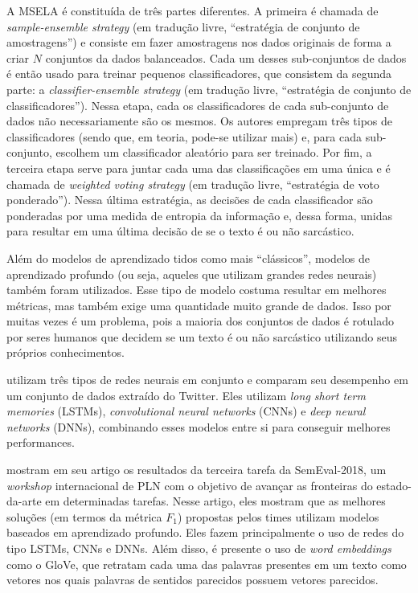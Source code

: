 A MSELA é constituída de três partes diferentes. A primeira é chamada de
\textit{sample-ensemble strategy} (em tradução livre, ``estratégia de conjunto
de amostragens'') e consiste em fazer amostragens nos dados originais de forma a
criar $N$ conjuntos da dados balanceados. Cada um desses sub-conjuntos de dados
é então usado para treinar pequenos classificadores, que consistem da segunda
parte: a \textit{classifier-ensemble strategy} (em tradução livre, ``estratégia
de conjunto de classificadores''). Nessa etapa, cada os classificadores de cada
sub-conjunto de dados não necessariamente são os mesmos. Os autores empregam
três tipos de classificadores (sendo que, em teoria, pode-se utilizar mais) e,
para cada sub-conjunto, escolhem um classificador aleatório para ser treinado.
Por fim, a terceira etapa serve para juntar cada uma das classificações em uma
única e é chamada de \textit{weighted voting strategy} (em tradução livre,
``estratégia de voto ponderado''). Nessa última estratégia, as decisões de cada
classificador são ponderadas por uma medida de entropia da informação e, dessa
forma, unidas para resultar em uma última decisão de se o texto é ou não
sarcástico.

Além do modelos de aprendizado tidos como mais ``clássicos'', modelos de
aprendizado profundo (ou seja, aqueles que utilizam grandes redes neurais)
também foram utilizados. Esse tipo de modelo costuma resultar em melhores
métricas, mas também exige uma quantidade muito grande de dados. Isso por muitas
vezes é um problema, pois a maioria dos conjuntos de dados é rotulado por seres
humanos que decidem se um texto é ou não sarcástico utilizando seus próprios
conhecimentos.

\cite{ghosh-veale:2016:fracking-sarcasm-nn} utilizam três tipos de redes neurais
em conjunto e comparam seu desempenho em um conjunto de dados extraído do
Twitter. Eles utilizam \textit{long short term memories} (LSTMs),
\textit{convolutional neural networks} (CNNs) e \textit{deep neural networks}
(DNNs), combinando esses modelos entre si para conseguir melhores performances.

\cite{van-hee-etal:2018:semeval} mostram em seu artigo os resultados da terceira
tarefa da SemEval-2018, um \textit{workshop} internacional de PLN com o objetivo
de avançar as fronteiras do estado-da-arte em determinadas tarefas. Nesse
artigo, eles mostram que as melhores soluções (em termos da métrica $F_1$)
propostas pelos times utilizam modelos baseados em aprendizado profundo. Eles
fazem principalmente o uso de redes do tipo LSTMs, CNNs e DNNs. Além disso, é
presente o uso de \textit{word embeddings} como o GloVe, que retratam cada uma
das palavras presentes em um texto como vetores nos quais palavras de sentidos
parecidos possuem vetores parecidos.

